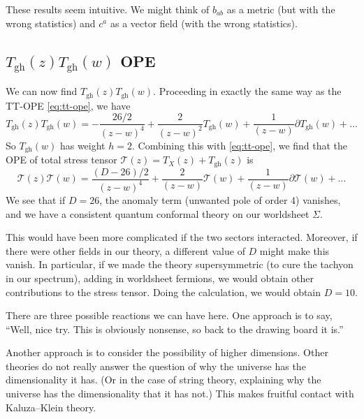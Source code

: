 
These results seem intuitive. We might think of $b_{ab}$ as a metric (but with the wrong statistics) and $c^{a}$ as a vector field (with the wrong statistics).

\subsection{\texorpdfstring{$T_{\text{gh}}(z) T_{\text{gh}}(w)$}{Ghost-Ghost} OPE}%
\label{sub:ghost_ghost_ope}

We can now find $T_{\text{gh}}(z) T_{\text{gh}}(w)$.
Proceeding in exactly the same way as the TT-OPE \eqref{eq:tt-ope}, we have
\begin{equation}
  T_{\text{gh}}(z) T_{\text{gh}}(w) = -\frac{26 / 2}{(z - w)^4} + \frac{2}{(z - w)^2} T_{\text{gh}}(w) + \frac{1}{(z - w)} \partial T_{\text{gh}}(w) + \dots
\end{equation}
So $T_{\text{gh}}(w)$ has weight $h = 2$.
Combining this with \eqref{eq:tt-ope}, we find that the OPE of total stress tensor $\mathcal{T}(z) = T_X (z) + T_{\text{gh}}(z)$ is
\begin{equation}
  \boxed{\mathcal{T}(z) \mathcal{T}(w) = \frac{(D - 26) / 2}{(z - w)^4} + \frac{2}{(z - w)} \mathcal{T}(w) + \frac{1}{(z - w)} \partial \mathcal{T}(w) + \dots}
\end{equation}
We see that if $D = 26$, the anomaly term (unwanted pole of order 4) vanishes, and we have a consistent quantum conformal theory on our worldsheet $\Sigma$.

This would have been more complicated if the two sectors interacted.
Moreover, if there were other fields in our theory, a different value of $D$ might make this vanish.
In particular, if we made the theory supersymmetric (to cure the tachyon in our spectrum), adding in worldsheet fermions, we would obtain other contributions to the stress tensor.
Doing the calculation, we would obtain $D = 10$.

There are three possible reactions we can have here.
One approach is to say, ``Well, nice try. This is obviously nonsense, so back to the drawing board it is.''

Another approach is to consider the possibility of higher dimensions. Other theories do not really answer the question of why the universe has the dimensionality it has. (Or in the case of string theory, explaining why the universe has the dimensionality that it has not.) This makes fruitful contact with Kaluza--Klein theory.

